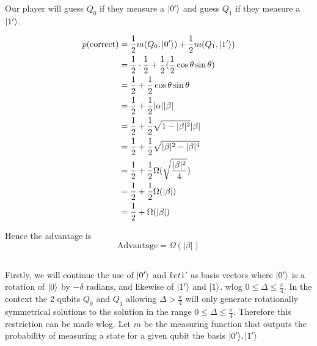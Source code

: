 Our player will guess $Q_0$ if they measure a $\lvert0'\rangle$ and guess $Q_1$ if they measure a $\lvert1'\rangle$.

\begin{align*}
    p(\text{correct}) &= \frac{1}{2} m(Q_0, \lvert0'\rangle) + \frac{1}{2} m(Q_1, \lvert1'\rangle)\\
     &= \frac{1}{2}\cdot \frac{1}{2} + \frac{1}{2} (\frac{1}{2} \cos\theta \sin\theta)\\
     &= \frac{1}{2} + \frac{1}{2} \cos\theta \sin\theta\\
     &= \frac{1}{2} + \frac{1}{2} |\alpha| |\beta|\\
     &= \frac{1}{2} + \frac{1}{2} \sqrt{1-|\beta|^2} |\beta|\\
     &= \frac{1}{2} + \frac{1}{2} \sqrt{|\beta|^2-|\beta|^4}\\
     &= \frac{1}{2} + \frac{1}{2} \Omega(\sqrt{\frac{|\beta|^2}{4}})\\
     &= \frac{1}{2} + \frac{1}{2} \Omega(|\beta|)\\
     &= \frac{1}{2} + \Omega(|\beta|)\\
\end{align*}

Hence the advantage is
\[
    \text{Advantage}=\Omega(|\beta|)
\]



\subsection{}
Firstly, we will continue the use of $\lvert0'\rangle$ and $ket{1'}$ as basis vectors where $\lvert0'\rangle$ is a rotation of $\lvert0\rangle$ by $-\delta$ radians, and likewise of $\lvert1'\rangle$ and $\lvert1\rangle$.
wlog $0 \leq \Delta \leq \frac{\pi}{4}$.
In the context the 2 qubits $Q_0$ and $Q_1$ allowing $\Delta>\frac{\pi}{4}$ will only generate rotationally symmetrical solutions to the solution in the range $0 \leq \Delta \leq \frac{\pi}{4}$.
Therefore this restriction can be made wlog.
Let $m$ be the measuring function that outputs the probability of measuring a state for a given qubit the basis $\lvert0'\rangle, \lvert1'\rangle$ 

